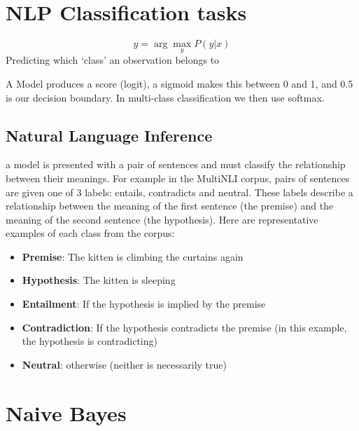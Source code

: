 \documentclass[11pt]{article}
\begin{document}


\tableofcontents

\clearpage

\section{NLP Classification tasks}

\begin{definition}[Classification]
    \begin{equation}
        \hat{y} = \arg\max_y P(y|x)    
    \end{equation}
    Predicting which `class' an observation belongs to
\end{definition}

A Model produces a score (logit), a sigmoid makes this between 0 and 1, and 0.5 is our decision boundary. In multi-class classification we then use softmax.

\subsection{Natural Language Inference}

a model is presented with a pair of sentences and must classify the relationship between their meanings. For example in the MultiNLI corpus, pairs of sentences are given one of 3 labels: entails, contradicts and neutral. These labels describe a relationship between the meaning of the first sentence (the premise) and the meaning of the second sentence (the hypothesis). Here are representative examples of each class from the corpus:

\begin{itemize}
    \item \textbf{Premise}: The kitten is climbing the curtains again
    \item \textbf{Hypothesis}: The kitten is sleeping
    \item \textbf{Entailment}: If the hypothesis is implied by the premise
    \item \textbf{Contradiction}: If the hypothesis contradicts the premise (in this example, the hypothesis is contradicting)
    \item \textbf{Neutral}: otherwise (neither is necessarily true)
\end{itemize}

\section{Naive Bayes}
\end{document}
